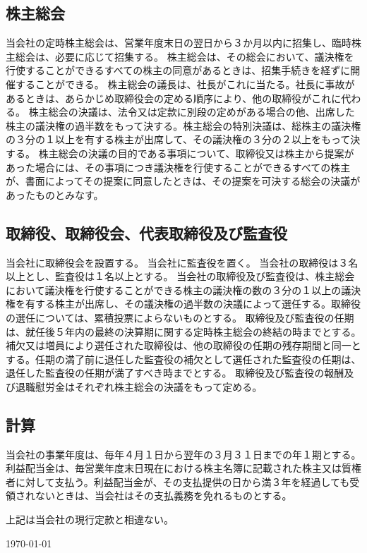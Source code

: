 \documentclass[10pt,a4paper,uplatex]{jsarticle}
\begin{document}
\subsection{株主総会}
当会社の定時株主総会は、営業年度末日の翌日から３か月以内に招集し、臨時株主総会は、必要に応じて招集する。
株主総会は、その総会において、議決権を行使することができるすべての株主の同意があるときは、招集手続きを経ずに開催することができる。
株主総会の議長は、社長がこれに当たる。社長に事故があるときは、あらかじめ取締役会の定める順序により、他の取締役がこれに代わる。
株主総会の決議は、法令又は定款に別段の定めがある場合の他、出席した株主の議決権の過半数をもって決する。株主総会の特別決議は、総株主の議決権の３分の１以上を有する株主が出席して、その議決権の３分の２以上をもって決する。
株主総会の決議の目的である事項について、取締役又は株主から提案があった場合には、その事項につき議決権を行使することができるすべての株主が、書面によってその提案に同意したときは、その提案を可決する総会の決議があったものとみなす。

\subsection{取締役、取締役会、代表取締役及び監査役}
当会社に取締役会を設置する。
当会社に監査役を置く。
当会社の取締役は３名以上とし、監査役は１名以上とする。
当会社の取締役及び監査役は、株主総会において議決権を行使することができる株主の議決権の数の３分の１以上の議決権を有する株主が出席し、その議決権の過半数の決議によって選任する。取締役の選任については、累積投票によらないものとする。
取締役及び監査役の任期は、就任後５年内の最終の決算期に関する定時株主総会の終結の時までとする。補欠又は増員により選任された取締役は、他の取締役の任期の残存期間と同一とする。任期の満了前に退任した監査役の補欠として選任された監査役の任期は、退任した監査役の任期が満了すべき時までとする。
取締役及び監査役の報酬及び退職慰労金はそれぞれ株主総会の決議をもって定める。


\subsection{計算}
当会社の事業年度は、毎年４月１日から翌年の３月３１日までの年１期とする。
利益配当金は、毎営業年度末日現在における株主名簿に記載された株主又は質権者に対して支払う。利益配当金が、その支払提供の日から満３年を経過しても受領されないときは、当会社はその支払義務を免れるものとする。


\vspace{20pt}
上記は当会社の現行定款と相違ない。
\begin{flushleft} 
\today\\
\vspace{10pt}
\MakeSignatureField
\end{flushleft}
\end{document}
